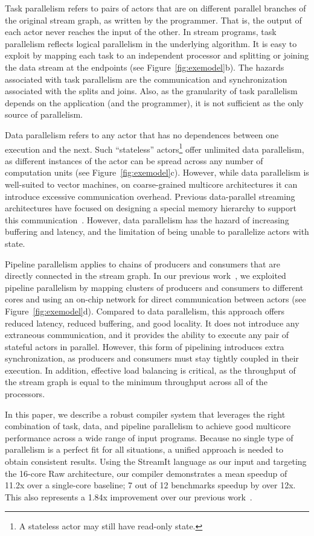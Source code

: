 Task parallelism refers to pairs of actors that are on different
parallel branches of the original stream graph, as written by the
programmer.  That is, the output of each actor never reaches the input
of the other.  In stream programs, task parallelism reflects logical
parallelism in the underlying algorithm.  It is easy to exploit by
mapping each task to an independent processor and splitting or joining
the data stream at the endpoints (see Figure~\ref{fig:exemodel}b).
The hazards associated with task parallelism are the communication and
synchronization associated with the splits and joins.  Also, as the
granularity of task parallelism depends on the application (and the
programmer), it is not sufficient as the only source of parallelism.

Data parallelism refers to any actor that has no dependences between
one execution and the next.  Such ``stateless'' actors\footnote{A
stateless actor may still have read-only state.}  offer unlimited data
parallelism, as different instances of the actor can be spread across
any number of computation units (see Figure~\ref{fig:exemodel}c).
However, while data parallelism is well-suited to vector machines, on
coarse-grained multicore architectures it can introduce excessive
communication overhead.  Previous data-parallel streaming
architectures have focused on designing a special memory hierarchy to
support this communication~\cite{imagine03ieee}.  However, data
parallelism has the hazard of increasing buffering and latency, and
the limitation of being unable to parallelize actors with state.

Pipeline parallelism applies to chains of producers and consumers that
are directly connected in the stream graph.  In our previous
work~\cite{streamit-asplos}, we exploited pipeline parallelism by
mapping clusters of producers and consumers to different cores and
using an on-chip network for direct communication between actors (see
Figure~\ref{fig:exemodel}d).  Compared to data parallelism, this
approach offers reduced latency, reduced buffering, and good locality.
It does not introduce any extraneous communication, and it provides
the ability to execute any pair of stateful actors in parallel.
However, this form of pipelining introduces extra synchronization, as
producers and consumers must stay tightly coupled in their execution.
In addition, effective load balancing is critical, as the throughput
of the stream graph is equal to the minimum throughput across all of
the processors.

In this paper, we describe a robust compiler system that leverages the
right combination of task, data, and pipeline parallelism to achieve
good multicore performance across a wide range of input programs.
Because no single type of parallelism is a perfect fit for all
situations, a unified approach is needed to obtain consistent results.
Using the StreamIt language as our input and targeting the 16-core Raw
architecture, our compiler demonstrates a mean speedup of 11.2x over a
single-core baseline; 7 out of 12 benchmarks speedup by over 12x.
This also represents a 1.84x improvement over our previous
work~\cite{streamit-asplos}.


